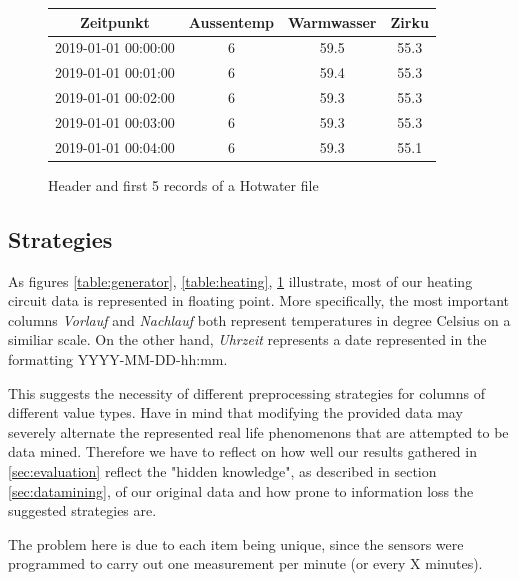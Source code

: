 \documentclass[bachelor,english]{info1thesis}
\begin{document}
\begin{figure}
	\begin{center}
		\begin{tabular}{||c c c c||} 
			\hline
			Zeitpunkt & Aussentemp & Warmwasser & Zirku \\ [0.5ex] 
			\hline\hline
			2019-01-01 00:00:00 & 6 & 59.5 & 55.3 \\ 
			\hline
			2019-01-01 00:01:00 & 6 & 59.4 & 55.3 \\
			\hline
			2019-01-01 00:02:00 & 6 & 59.3 & 55.3 \\
			\hline
			2019-01-01 00:03:00 & 6 & 59.3 & 55.3 \\
			\hline
			2019-01-01 00:04:00 & 6 & 59.3 & 55.1 \\ [1ex] 
			\hline
		\end{tabular}
	\end{center}
	\caption{Header and first 5 records of a Hotwater file}
	\label{table:hotwater}
		\vspace{0.2cm}
\end{figure}

\subsection{Strategies}
\label{sec:strategies}

As figures \ref{table:generator}, \ref{table:heating}, \ref{table:hotwater} illustrate, most of our heating circuit data is represented in floating point. More specifically, the most important columns \textit{Vorlauf} and \textit{Nachlauf} both represent temperatures in degree Celsius on a similiar scale. On the other hand, \textit{Uhrzeit} represents a date represented in the formatting YYYY-MM-DD-hh:mm. 



This suggests the necessity of different preprocessing strategies for columns of different value types. Have in mind that modifying the provided data may severely alternate the represented real life phenomenons that are attempted to be data mined. Therefore we have to reflect on how well our results gathered in \ref{sec:evaluation} reflect the "hidden knowledge", as described in section \ref{sec:datamining}, of our original data and how prone to information loss the suggested strategies are.


The problem here is due to each item being unique, since the sensors were programmed to carry out one measurement per minute (or every X minutes). 
\end{document}

